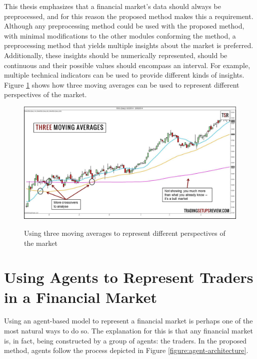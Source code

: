 This thesis emphasizes that a financial market's data should always be
preprocessed, and for this reason the proposed method makes this a
requirement. Although any preprocessing method could be used with the proposed
method, with minimal modifications to the other modules conforming the method, a
preprocessing method that yields multiple insights about the market is
preferred. Additionally, these insights should be numerically represented,
should be continuous and their possible values should encompass an interval. For
example, multiple technical indicators can be used to provide different kinds of
insights. Figure \ref{figure:multiple-technical-indicators} shows how three moving
averages can be used to represent different perspectives of the market.

\begin{figure}
\caption{Using three moving averages to represent different perspectives of the market} \centering
\includegraphics[width=1.0\textwidth]{img/multiple-technical-indicators.jpg}
\label{figure:multiple-technical-indicators}
\end{figure}

\section{Using Agents to Represent Traders in a Financial Market}
\label{section:using-agents-to-represent-traders-in-a-financial-market}

Using an agent-based model to represent a financial market is perhaps one of the
most natural ways to do so. The explanation for this is that any financial
market is, in fact, being constructed by a group of agents: the traders. In the
proposed method, agents follow the process depicted in Figure
\ref{figure:agent-architecture}.


